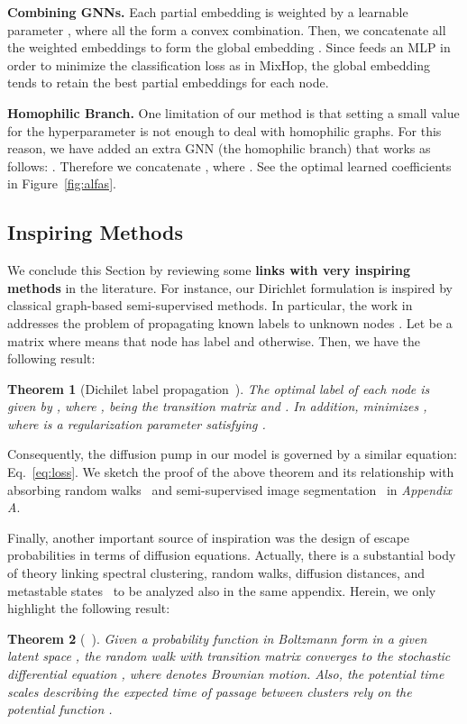 \documentclass{article}
\theoremstyle{plain}
\newtheorem{theorem}{Theorem}[section]
\theoremstyle{definition}
\begin{document}
\textbf{Combining GNNs.} Each partial embedding  is weighted by a learnable parameter , where all the  form a convex combination. Then, we concatenate all the weighted embeddings to form the global embedding . Since  feeds an MLP in order to minimize the classification loss  as in MixHop, the global embedding tends to retain the best partial embeddings for each node. 

\textbf{Homophilic Branch.} One limitation of our method is that setting a small value for the hyperparameter  is not enough to deal with homophilic graphs. For this reason, we have added an extra GNN (the homophilic branch) that works as follows: . Therefore we concatenate , where . See the optimal learned coefficients in Figure~\ref{fig:alfas}.







\subsection{Inspiring Methods}
We conclude this Section by reviewing some \textbf{links with very inspiring methods} in the literature. For instance, our Dirichlet formulation is inspired by classical graph-based semi-supervised methods. In particular, the work in~\citep{Zhou03} addresses the problem of propagating known labels  to unknown nodes . Let  be a  matrix where  means that node  has label  and  otherwise. Then, we have the following result:
\begin{theorem}[Dichilet label propagation~\citep{Zhou03}]\label{th:2}
    The optimal label of each node  is given by , where , being  the transition matrix and . In addition,  minimizes , where  is a regularization parameter satisfying .
\end{theorem}
Consequently, the diffusion pump in our model is governed by a similar equation: Eq.~\ref{eq:loss}. We sketch the proof of the above theorem and its relationship with absorbing random walks~\citep{doyle2000random} and semi-supervised image segmentation~\citep{Grady06} in \emph{Appendix A}. 

Finally, another important source of inspiration was the design of escape probabilities in terms of diffusion equations. Actually, there is a substantial body of theory linking spectral clustering, random walks, diffusion distances, and metastable states~\citep{pmlr-vR3-meila01a}\citep{difmaps05}\citep{sclimitations06} to be analyzed also in the same appendix. Herein, we only highlight the following result: 
\begin{theorem}[~\citep{sclimitations06}]\label{th:3}
Given a probability function in Boltzmann form  in a given latent space , the random walk with transition matrix  converges to the stochastic differential equation , where  denotes Brownian motion. Also, the potential time scales describing the expected time of passage between clusters rely on the potential function .
\end{theorem}
\end{document}
